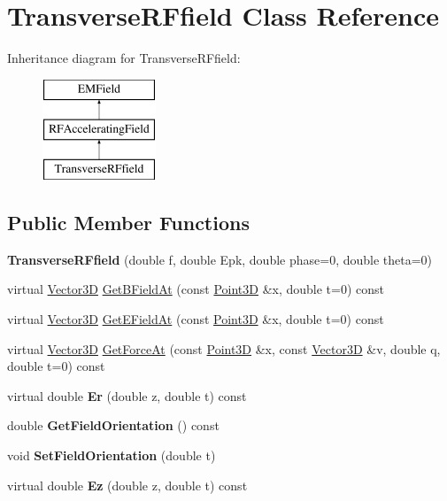 \hypertarget{classTransverseRFfield}{}\section{Transverse\+R\+Ffield Class Reference}
\label{classTransverseRFfield}
Inheritance diagram for Transverse\+R\+Ffield\+:\begin{figure}[H]
\begin{center}
\leavevmode
\includegraphics[height=3.000000cm]{classTransverseRFfield}
\end{center}
\end{figure}
\subsection*{Public Member Functions}
\begin{DoxyCompactItemize}
\item 
\mbox{\label{classTransverseRFfield_aef1c95c77fb2fa993b13e0fe02e263c2}} 
{\bfseries Transverse\+R\+Ffield} (double f, double Epk, double phase=0, double theta=0)
\item 
virtual \hyperlink{classTVec3D}{Vector3D} \hyperlink{classTransverseRFfield_a2611f12fe6dea94c5aaa57267396bcb0}{Get\+B\+Field\+At} (const \hyperlink{classTVec3D}{Point3D} \&x, double t=0) const
\item 
virtual \hyperlink{classTVec3D}{Vector3D} \hyperlink{classTransverseRFfield_a3efd2da8ae985720208f3d439ffabfac}{Get\+E\+Field\+At} (const \hyperlink{classTVec3D}{Point3D} \&x, double t=0) const
\item 
virtual \hyperlink{classTVec3D}{Vector3D} \hyperlink{classTransverseRFfield_a3251fc6bd5c3393ae47956a55036e1e8}{Get\+Force\+At} (const \hyperlink{classTVec3D}{Point3D} \&x, const \hyperlink{classTVec3D}{Vector3D} \&v, double q, double t=0) const
\item 
\mbox{\label{classTransverseRFfield_a9e9afd185d51c209507ea7cf8cd077e1}} 
virtual double {\bfseries Er} (double z, double t) const
\item 
\mbox{\label{classTransverseRFfield_a0889a6025999d5a794859437e01551a1}} 
double {\bfseries Get\+Field\+Orientation} () const
\item 
\mbox{\label{classTransverseRFfield_ad8fa7b4c9bf9237977348ecbfdb79094}} 
void {\bfseries Set\+Field\+Orientation} (double t)
\item 
\mbox{\label{classTransverseRFfield_a30a486422c68d127b0097245a3fffb84}} 
virtual double {\bfseries Ez} (double z, double t) const
\end{DoxyCompactItemize}
